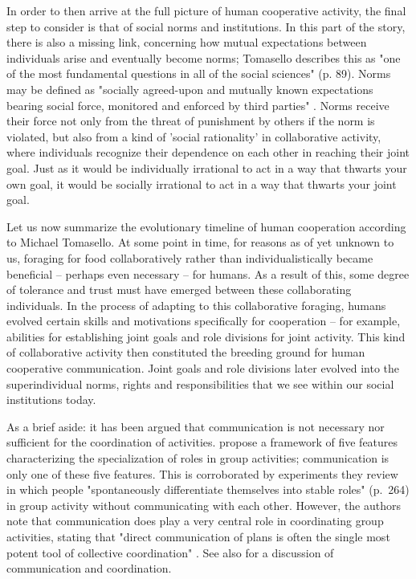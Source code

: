 In order to then arrive at the full picture of human cooperative activity, the final step to consider is that of social norms and institutions.
In this part of the story, there is also a missing link, concerning how mutual expectations between individuals arise and eventually become norms; Tomasello describes this as "one of the most fundamental questions in all of the social sciences" (p. 89).
Norms may be defined as "socially agreed-upon and mutually known expectations bearing social force, monitored and enforced by third parties" \citep[p.~87]{Tomasello09}. Norms receive their force not only from the threat of punishment by others if the norm is violated, but also from a kind of 'social rationality' in collaborative activity, where individuals recognize their dependence on each other in reaching their joint goal. Just as it would be individually irrational to act in a way that thwarts your own goal, it would be socially irrational to act in a way that thwarts your joint goal.

Let us now summarize the evolutionary timeline of human cooperation according to Michael Tomasello.
At some point in time, for reasons as of yet unknown to us, foraging for food collaboratively rather than individualistically became beneficial -- perhaps even necessary -- for humans.
As a result of this, some degree of tolerance and trust must have emerged between these collaborating individuals.
In the process of adapting to this collaborative foraging, humans evolved certain skills and motivations specifically for cooperation -- for example, abilities for establishing joint goals and role divisions for joint activity.
This kind of collaborative activity then constituted the breeding ground for human cooperative communication.
Joint goals and role divisions later evolved into the superindividual norms, rights and responsibilities that we see within our social institutions today.

As a brief aside: it has been argued that communication is not necessary nor sufficient for the coordination of activities. \citet{Goldstone24} propose a framework of five features characterizing the specialization of roles in group activities; communication is only one of these five features. This is corroborated by experiments they review in which people "spontaneously differentiate themselves into stable roles" (p.~264) in group activity without communicating with each other.
However, the authors note that communication does play a very central role in coordinating group activities, stating that "direct communication of plans is often the single most potent tool of collective coordination" \citep[p.~276]{Goldstone24}.
See also \citet{Vorobeychik17} for a discussion of communication and coordination.

